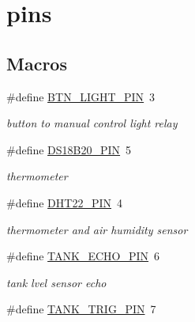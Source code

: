 \hypertarget{group__const}{}\section{pins}
\label{group__const}
\subsection*{Macros}
\begin{DoxyCompactItemize}
\item 
\mbox{\label{group__const_ga1d632364e35096e913d838260642af29}} 
\#define \hyperlink{group__const_ga1d632364e35096e913d838260642af29}{B\+T\+N\+\_\+\+L\+I\+G\+H\+T\+\_\+\+P\+IN}~3
\begin{DoxyCompactList}\small\item\em button to manual control light relay \end{DoxyCompactList}\item 
\mbox{\label{group__const_ga3f855075d38022018e7f7e076d1f1e6d}} 
\#define \hyperlink{group__const_ga3f855075d38022018e7f7e076d1f1e6d}{D\+S18\+B20\+\_\+\+P\+IN}~5
\begin{DoxyCompactList}\small\item\em thermometer \end{DoxyCompactList}\item 
\mbox{\label{group__const_ga170c6a1904d45873b6bf59acd2509143}} 
\#define \hyperlink{group__const_ga170c6a1904d45873b6bf59acd2509143}{D\+H\+T22\+\_\+\+P\+IN}~4
\begin{DoxyCompactList}\small\item\em thermometer and air humidity sensor \end{DoxyCompactList}\item 
\mbox{\label{group__const_ga0cfa21dd64840e782ff930d68d9dea56}} 
\#define \hyperlink{group__const_ga0cfa21dd64840e782ff930d68d9dea56}{T\+A\+N\+K\+\_\+\+E\+C\+H\+O\+\_\+\+P\+IN}~6
\begin{DoxyCompactList}\small\item\em tank lvel sensor echo \end{DoxyCompactList}\item 
\mbox{\label{group__const_ga56ccecd709fd49a45742881dbea2bb86}} 
\#define \hyperlink{group__const_ga56ccecd709fd49a45742881dbea2bb86}{T\+A\+N\+K\+\_\+\+T\+R\+I\+G\+\_\+\+P\+IN}~7

\end{DoxyCompactItemize}
